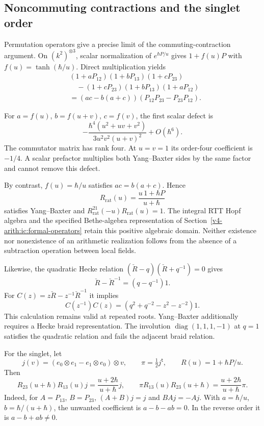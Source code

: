 \subsection{Noncommuting contractions and the singlet order}

Permutation operators give a precise limit of the
commuting-contraction argument.
On $(k^2)^{\otimes3}$, scalar normalization of
$e^{\hbar P/u}$ gives $1+f(u)P$ with
$f(u)=\tanh(\hbar/u)$.
Direct multiplication yields
\[
 \begin{split}
 &(1+aP_{12})(1+bP_{13})(1+cP_{23})\\
 &\quad-(1+cP_{23})(1+bP_{13})(1+aP_{12})\\
 &=(ac-b(a+c))(P_{12}P_{23}-P_{23}P_{12}).
 \end{split}
\]

For $a=f(u)$, $b=f(u+v)$, $c=f(v)$, the first scalar defect is
\[
 -\frac{\hbar^4(u^2+uv+v^2)}
 {3u^2v^2(u+v)^2}+O(\hbar^6).
\]
The commutator matrix has rank four.
At $u=v=1$ its order-four coefficient is $-1/4$.
A scalar prefactor multiplies both Yang--Baxter sides
by the same factor and cannot remove this defect.

By contrast, $f(u)=\hbar/u$ satisfies $ac=b(a+c)$.
Hence
\[
 R_{\mathrm{rat}}(u)=\frac{u\,1+\hbar P}{u+\hbar}
\]
satisfies Yang--Baxter and
$R_{\mathrm{rat}}^{21}(-u)R_{\mathrm{rat}}(u)=1$.
The integral RTT Hopf algebra and the specified
Bethe-algebra representation of
Section~\ref{v4-arith:ic:formal-operators}
retain this positive algebraic domain.
Neither existence nor nonexistence of an arithmetic
realization follows from the absence of a subtraction
operation between local fields.

Likewise, the quadratic Hecke relation
$(\check R-q)(\check R+q^{-1})=0$ gives
\[
 \check R-\check R^{-1}=(q-q^{-1})1.
\]
For $C(z)=z\check R-z^{-1}\check R^{-1}$ it implies
\[
 C(z^{-1})C(z)=(q^2+q^{-2}-z^2-z^{-2})1.
\]
This calculation remains valid at repeated roots.
Yang--Baxter additionally requires a Hecke braid
representation. The involution
$\operatorname{diag}(1,1,1,-1)$ at $q=1$ satisfies
the quadratic relation and fails the adjacent braid relation.

For the singlet, let
\[
 j(v)=(e_0\otimes e_1-e_1\otimes e_0)\otimes v,\qquad
 \pi=\tfrac12j^{\mathsf t},\qquad R(u)=1+\hbar P/u.
\]
Then
\[
 R_{23}(u+\hbar)R_{13}(u)j
 =\frac{u+2\hbar}{u+\hbar}j,\qquad
 \pi R_{13}(u)R_{23}(u+\hbar)
 =\frac{u+2\hbar}{u+\hbar}\pi.
\]
Indeed, for $A=P_{13}$, $B=P_{23}$,
$(A+B)j=j$ and $BAj=-Aj$.
With $a=\hbar/u$, $b=\hbar/(u+\hbar)$,
the unwanted coefficient is $a-b-ab=0$.
In the reverse order it is $a-b+ab\ne0$.


